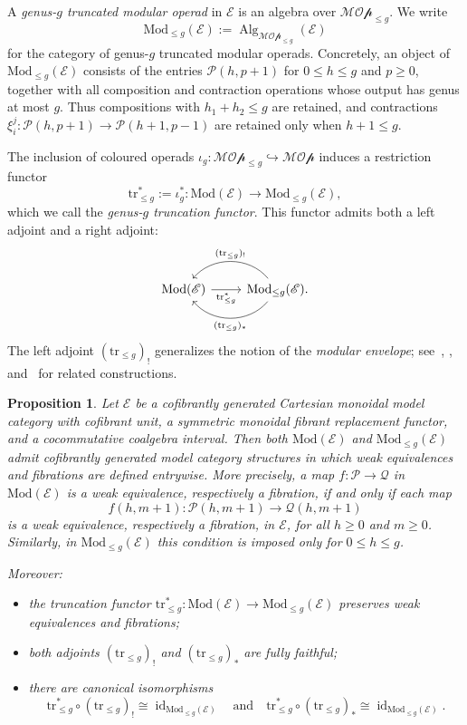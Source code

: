 \documentclass{amsart}
\newcommand{\bE}{\mathscr{E}}
\newcommand{\Mod}{\mathrm{Mod}}
\newcommand{\id}{\operatorname{id}}
\newcommand{\Alg}{\operatorname{Alg}}
\newcommand{\trun}[1]{\mathrm{tr}_{\leq{#1}}}
\newtheorem{prop}[theorem]{Proposition}%
\theoremstyle{definition}
\numberwithin{equation}{section}
\begin{document}
A \emph{genus-$g$ truncated modular operad} in $\bE$ is an algebra over $\mathcal{MOp}_{\leq g}$. We write
\[
\Mod_{\leq g}(\bE):=\Alg_{\mathcal{MOp}_{\leq g}}(\bE)
\]
for the category of genus-$g$ truncated modular operads. Concretely, an object of $\Mod_{\leq g}(\bE)$ consists of the entries $\mathcal P(h,p+1)$ for $0\leq h\leq g$ and $p\geq 0$, together with all composition and contraction operations whose output has genus at most $g$. Thus compositions with $h_1+h_2\leq g$ are retained, and contractions $\xi_i^j:\mathcal P(h,p+1)\to \mathcal P(h+1,p-1)$ are retained only when $h+1\leq g$.

The inclusion of coloured operads $\iota_g:\mathcal{MOp}_{\leq g}\hookrightarrow \mathcal{MOp}$
induces a restriction functor
\[
\trun{g}^*:=\iota_g^*:\Mod(\bE)\longrightarrow \Mod_{\leq g}(\bE),
\]
which we call the \emph{genus-$g$ truncation functor}. This functor admits both a left adjoint and a right adjoint:
\begin{equation}\label{eq: truncation adjunction}
\begin{tikzcd}
\Mod(\bE) \arrow[r, swap, "\trun{g}^*"] &
\Mod_{\leq g}(\bE)
\arrow[l, bend left=50, "(\trun{g})_*"]
\arrow[l, bend right=50, swap, "(\trun{g})_!"] .
\end{tikzcd}
\end{equation}
The left adjoint $(\trun{g})_!$ generalizes the notion of the \emph{modular envelope}; see~\cite{Ward}, \cite[Appendix~A]{dch_coextension}, and~\cite[§4]{GNPR} for related constructions.


\begin{prop}\label{prop: truncation is Quillen functor}
Let $\bE$ be a cofibrantly generated Cartesian monoidal model category with cofibrant unit, a symmetric monoidal fibrant replacement functor, and a cocommutative coalgebra interval. Then both $\Mod(\bE)$ and $\Mod_{\leq g}(\bE)$ admit cofibrantly generated model category structures in which weak equivalences and fibrations are defined entrywise. More precisely, a map $f:\mathcal P\to \mathcal Q$ in $\Mod(\bE)$ is a weak equivalence, respectively a fibration, if and only if each map
\[
f(h,m+1):\mathcal P(h,m+1)\longrightarrow \mathcal Q(h,m+1)
\]
is a weak equivalence, respectively a fibration, in $\bE$, for all $h\geq 0$ and $m\geq 0$. Similarly, in $\Mod_{\leq g}(\bE)$ this condition is imposed only for $0\leq h\leq g$.

Moreover:
\begin{itemize}
    \item the truncation functor
    $\trun{g}^*:\Mod(\bE)\to\Mod_{\leq g}(\bE)$ preserves weak equivalences and
    fibrations;
    \item both adjoints $(\trun{g})_!$ and $(\trun{g})_*$ are fully faithful;
    \item there are canonical isomorphisms
    \[
    \trun{g}^* \circ (\trun{g})_! \cong \id_{\Mod_{\leq g}(\bE)}
    \quad \text{and} \quad
    \trun{g}^* \circ (\trun{g})_* \cong \id_{\Mod_{\leq g}(\bE)}.
    \]
\end{itemize}
\end{prop}
\end{document}
